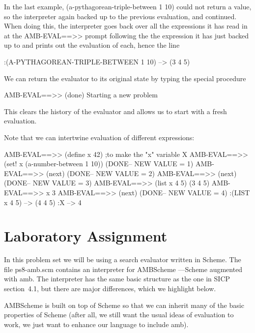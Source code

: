 In the last example, {\cf (a-pythagorean-triple-between 1 10)} could
not return a value, so the interpreter again backed up to the
previous evaluation, and continued. When doing this, the interpreter
goes back over all the expressions it has read in at the {\cf AMB-EVAL==>>}
prompt following the the expression it has just backed up to and prints out the
evaluation of each, hence the line

\beginlisp 
:(A-PYTHAGOREAN-TRIPLE-BETWEEN 1 10) --> (3 4 5)
\endlisp

We can return the evaluator to its original state by typing the special
procedure

\beginlisp
AMB-EVAL==>> (done)
Starting a new problem
\endlisp

This clears the history of the evaluator and allows us to start with a
fresh evaluation.

Note that we can intertwine evaluation of different expressions:

\beginlisp
AMB-EVAL==>> (define x 42)   ;to make the "x" variable
X
\null
AMB-EVAL==>> (set! x (a-number-between 1 10))
(DONE-- NEW VALUE = 1)
\null
AMB-EVAL==>> (next)
(DONE-- NEW VALUE = 2)
\null
AMB-EVAL==>> (next)
(DONE-- NEW VALUE = 3)
\null
AMB-EVAL==>> (list x 4 5)
(3 4 5)
\null
AMB-EVAL==>> x
3
\null
AMB-EVAL==>> (next)
(DONE-- NEW VALUE = 4)
:(LIST x 4 5) --> (4 4 5)
:X --> 4
\endlisp

\section{Laboratory Assignment}


In this problem set we will be using a search evaluator written in
{\sc Scheme}.  The file {\cf ps8-amb.scm} contains an interpreter for
{\sc AMBScheme} ---{\sc Scheme} augmented with {\cf amb}.  The interpreter has the
same basic structure as the one in SICP section~4.1, but there are
major differences, which we highlight below.


{\sc AMBScheme} is built on top of {\sc Scheme} so that we can inherit many of
the basic properties of {\sc Scheme} (after all, we still want the usual
ideas of evaluation to work, we just want to enhance our language to
include {\cf amb}).


